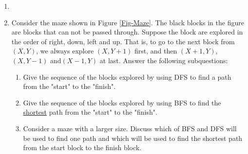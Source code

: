 \documentclass[12pt,a4paper]{article}
\makeatletter
\newtheorem*{solution}{Solution}
\theoremstyle{definition}
\renewenvironment{solution}[1][Solution] {\par\pushQED{\qed}\normalfont\topsep6\p@\@plus6\p@\relax\trivlist\item[\hskip\labelsep\bfseries#1\@addpunct{.}]\ignorespaces}{\popQED\endtrivlist\@endpefalse} \makeatother
\makeatother
\begin{document}
\begin{enumerate}
\begin{solution}
	
    \end{solution}
    \item Consider the maze shown in Figure \ref{Fig-Maze}. The black blocks in the figure are blocks that can not be passed through. Suppose the block are explored in the order of right, down, left and up. That is, to go to the next block from $(X,Y)$, we always explore $(X,Y+1)$ first, and then $(X+1,Y)$,$(X,Y-1)$ and$(X-1,Y)$ at last. Answer the following subquestions:
    \begin{enumerate}
        \item Give the sequence of the blocks explored by using DFS to find a path from the "start" to the "finish".
        \item Give the sequence of the blocks explored by using BFS to find the \underline{shortest} path from the "start" to the "finish".
        \item Consider a maze with a larger size. Discuss which of BFS and DFS will be used to find one path and which will be used to find the shortest path from the start block to the finish block.
    \end{enumerate}
    

\end{enumerate}
\end{document}
